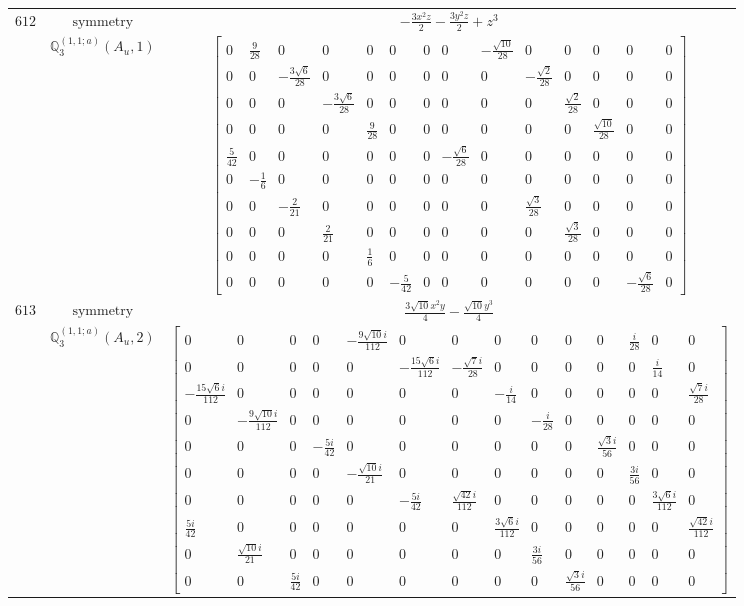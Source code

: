 \documentclass[fleqn,8pt,landscape]{jsarticle}
\begin{document}
\begin{longtable}{ccc}
$ 612 $ & $ \text{symmetry} $ & $ - \frac{3 x^{2} z}{2} - \frac{3 y^{2} z}{2} + z^{3} $ \\
$  $ & $ \mathbb{Q}_{3}^{(1,1;a)}(A_{u},1) $ & $ \begin{bmatrix} 0 & \frac{9}{28} & 0 & 0 & 0 & 0 & 0 & 0 & - \frac{\sqrt{10}}{28} & 0 & 0 & 0 & 0 & 0 \\ 0 & 0 & - \frac{3 \sqrt{6}}{28} & 0 & 0 & 0 & 0 & 0 & 0 & - \frac{\sqrt{2}}{28} & 0 & 0 & 0 & 0 \\ 0 & 0 & 0 & - \frac{3 \sqrt{6}}{28} & 0 & 0 & 0 & 0 & 0 & 0 & \frac{\sqrt{2}}{28} & 0 & 0 & 0 \\ 0 & 0 & 0 & 0 & \frac{9}{28} & 0 & 0 & 0 & 0 & 0 & 0 & \frac{\sqrt{10}}{28} & 0 & 0 \\ \frac{5}{42} & 0 & 0 & 0 & 0 & 0 & 0 & - \frac{\sqrt{6}}{28} & 0 & 0 & 0 & 0 & 0 & 0 \\ 0 & - \frac{1}{6} & 0 & 0 & 0 & 0 & 0 & 0 & 0 & 0 & 0 & 0 & 0 & 0 \\ 0 & 0 & - \frac{2}{21} & 0 & 0 & 0 & 0 & 0 & 0 & \frac{\sqrt{3}}{28} & 0 & 0 & 0 & 0 \\ 0 & 0 & 0 & \frac{2}{21} & 0 & 0 & 0 & 0 & 0 & 0 & \frac{\sqrt{3}}{28} & 0 & 0 & 0 \\ 0 & 0 & 0 & 0 & \frac{1}{6} & 0 & 0 & 0 & 0 & 0 & 0 & 0 & 0 & 0 \\ 0 & 0 & 0 & 0 & 0 & - \frac{5}{42} & 0 & 0 & 0 & 0 & 0 & 0 & - \frac{\sqrt{6}}{28} & 0 \end{bmatrix} $ \\ \hline
$ 613 $ & $ \text{symmetry} $ & $ \frac{3 \sqrt{10} x^{2} y}{4} - \frac{\sqrt{10} y^{3}}{4} $ \\
$  $ & $ \mathbb{Q}_{3}^{(1,1;a)}(A_{u},2) $ & $ \begin{bmatrix} 0 & 0 & 0 & 0 & - \frac{9 \sqrt{10} i}{112} & 0 & 0 & 0 & 0 & 0 & 0 & \frac{i}{28} & 0 & 0 \\ 0 & 0 & 0 & 0 & 0 & - \frac{15 \sqrt{6} i}{112} & - \frac{\sqrt{7} i}{28} & 0 & 0 & 0 & 0 & 0 & \frac{i}{14} & 0 \\ - \frac{15 \sqrt{6} i}{112} & 0 & 0 & 0 & 0 & 0 & 0 & - \frac{i}{14} & 0 & 0 & 0 & 0 & 0 & \frac{\sqrt{7} i}{28} \\ 0 & - \frac{9 \sqrt{10} i}{112} & 0 & 0 & 0 & 0 & 0 & 0 & - \frac{i}{28} & 0 & 0 & 0 & 0 & 0 \\ 0 & 0 & 0 & - \frac{5 i}{42} & 0 & 0 & 0 & 0 & 0 & 0 & \frac{\sqrt{3} i}{56} & 0 & 0 & 0 \\ 0 & 0 & 0 & 0 & - \frac{\sqrt{10} i}{21} & 0 & 0 & 0 & 0 & 0 & 0 & \frac{3 i}{56} & 0 & 0 \\ 0 & 0 & 0 & 0 & 0 & - \frac{5 i}{42} & \frac{\sqrt{42} i}{112} & 0 & 0 & 0 & 0 & 0 & \frac{3 \sqrt{6} i}{112} & 0 \\ \frac{5 i}{42} & 0 & 0 & 0 & 0 & 0 & 0 & \frac{3 \sqrt{6} i}{112} & 0 & 0 & 0 & 0 & 0 & \frac{\sqrt{42} i}{112} \\ 0 & \frac{\sqrt{10} i}{21} & 0 & 0 & 0 & 0 & 0 & 0 & \frac{3 i}{56} & 0 & 0 & 0 & 0 & 0 \\ 0 & 0 & \frac{5 i}{42} & 0 & 0 & 0 & 0 & 0 & 0 & \frac{\sqrt{3} i}{56} & 0 & 0 & 0 & 0 \end{bmatrix} $ \\ \hline

\end{longtable}
\end{document}
